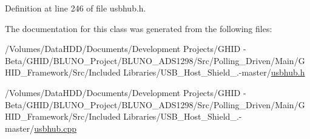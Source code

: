\-Definition at line 246 of file usbhub.\-h.



\-The documentation for this class was generated from the following files\-:\begin{DoxyCompactItemize}
\item 
/\-Volumes/\-Data\-H\-D\-D/\-Documents/\-Development Projects/\-G\-H\-I\-D -\/ Beta/\-G\-H\-I\-D/\-B\-L\-U\-N\-O\-\_\-\-Project/\-B\-L\-U\-N\-O\-\_\-\-A\-D\-S1298/\-Src/\-Polling\-\_\-\-Driven/\-Main/\-G\-H\-I\-D\-\_\-\-Framework/\-Src/\-Included Libraries/\-U\-S\-B\-\_\-\-Host\-\_\-\-Shield\-\_.-\/master/\hyperlink{usbhub_8h}{usbhub.\-h}\item 
/\-Volumes/\-Data\-H\-D\-D/\-Documents/\-Development Projects/\-G\-H\-I\-D -\/ Beta/\-G\-H\-I\-D/\-B\-L\-U\-N\-O\-\_\-\-Project/\-B\-L\-U\-N\-O\-\_\-\-A\-D\-S1298/\-Src/\-Polling\-\_\-\-Driven/\-Main/\-G\-H\-I\-D\-\_\-\-Framework/\-Src/\-Included Libraries/\-U\-S\-B\-\_\-\-Host\-\_\-\-Shield\-\_.-\/master/\hyperlink{usbhub_8cpp}{usbhub.\-cpp}\end{DoxyCompactItemize}
